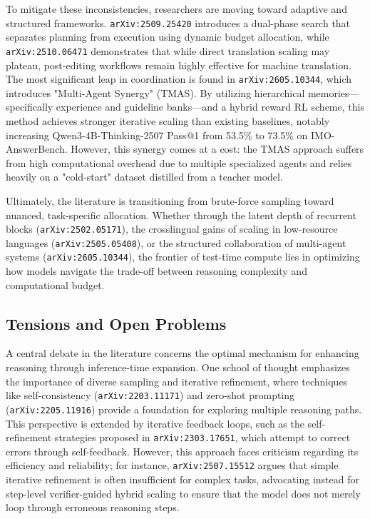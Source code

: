 \documentclass[11pt]{article}
\begin{document}
To mitigate these inconsistencies, researchers are moving toward adaptive and structured frameworks. \texttt{arXiv:2509.25420} introduces a dual-phase search that separates planning from execution using dynamic budget allocation, while \texttt{arXiv:2510.06471} demonstrates that while direct translation scaling may plateau, post-editing workflows remain highly effective for machine translation. The most significant leap in coordination is found in \texttt{arXiv:2605.10344}, which introduces "Multi-Agent Synergy" (TMAS). By utilizing hierarchical memories—specifically experience and guideline banks—and a hybrid reward RL scheme, this method achieves stronger iterative scaling than existing baselines, notably increasing Qwen3-4B-Thinking-2507 Pass@1 from 53.5\% to 73.5\% on IMO-AnswerBench. However, this synergy comes at a cost: the TMAS approach suffers from high computational overhead due to multiple specialized agents and relies heavily on a "cold-start" dataset distilled from a teacher model.

Ultimately, the literature is transitioning from brute-force sampling toward nuanced, task-specific allocation. Whether through the latent depth of recurrent blocks (\texttt{arXiv:2502.05171}), the crosslingual gains of scaling in low-resource languages (\texttt{arXiv:2505.05408}), or the structured collaboration of multi-agent systems (\texttt{arXiv:2605.10344}), the frontier of test-time compute lies in optimizing how models navigate the trade-off between reasoning complexity and computational budget.

\subsection{Tensions and Open Problems}

A central debate in the literature concerns the optimal mechanism for enhancing reasoning through inference-time expansion. One school of thought emphasizes the importance of diverse sampling and iterative refinement, where techniques like self-consistency (\texttt{arXiv:2203.11171}) and zero-shot prompting (\texttt{arXiv:2205.11916}) provide a foundation for exploring multiple reasoning paths. This perspective is extended by iterative feedback loops, such as the self-refinement strategies proposed in \texttt{arXiv:2303.17651}, which attempt to correct errors through self-feedback. However, this approach faces criticism regarding its efficiency and reliability; for instance, \texttt{arXiv:2507.15512} argues that simple iterative refinement is often insufficient for complex tasks, advocating instead for step-level verifier-guided hybrid scaling to ensure that the model does not merely loop through erroneous reasoning steps.
\end{document}
